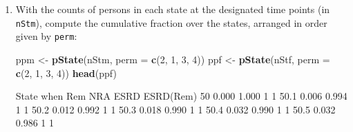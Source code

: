 \documentclass[
]{book}
\newenvironment{Shaded}{\begin{snugshade}}{\end{snugshade}}
\newcommand{\AttributeTok}[1]{\textcolor[rgb]{0.13,0.29,0.53}{#1}}
\newcommand{\DecValTok}[1]{\textcolor[rgb]{0.00,0.00,0.81}{#1}}
\newcommand{\FunctionTok}[1]{\textcolor[rgb]{0.13,0.29,0.53}{\textbf{#1}}}
\newcommand{\NormalTok}[1]{#1}
\newcommand{\OtherTok}[1]{\textcolor[rgb]{0.56,0.35,0.01}{#1}}
\begin{document}
\begin{enumerate}
\begin{Shaded}
\begin{Highlighting}[]
\NormalTok{      State}
\NormalTok{when   NRA Rem ESRD ESRD(Rem)}
\NormalTok{  50   500   0    0         0}
\NormalTok{  50.1 494   3    3         0}
\NormalTok{  50.2 490   6    4         0}
\NormalTok{  50.3 486   9    5         0}
\NormalTok{  50.4 479  16    5         0}
\NormalTok{  50.5 477  16    7         0}
\NormalTok{  50.6 472  20    8         0}
\NormalTok{  50.7 468  22   10         0}
\NormalTok{  50.8 463  24   13         0}
\NormalTok{  50.9 458  26   16         0}
\NormalTok{  51   456  27   17         0}
\NormalTok{  51.1 453  28   19         0}
\NormalTok{  51.2 443  33   24         0}
\NormalTok{  51.3 439  32   28         1}
\NormalTok{  51.4 432  33   34         1}
\end{Highlighting}
\end{Shaded}

  What is in the object \texttt{nStf}?
\item
  With the counts of persons in each state at the
  designated time points (in \texttt{nStm}), compute the cumulative
  fraction over the states, arranged in order given by \texttt{perm}:

\begin{Shaded}
\begin{Highlighting}[]
\NormalTok{ppm }\OtherTok{\textless{}{-}} \FunctionTok{pState}\NormalTok{(nStm, }\AttributeTok{perm =} \FunctionTok{c}\NormalTok{(}\DecValTok{2}\NormalTok{, }\DecValTok{1}\NormalTok{, }\DecValTok{3}\NormalTok{, }\DecValTok{4}\NormalTok{))}
\NormalTok{ppf }\OtherTok{\textless{}{-}} \FunctionTok{pState}\NormalTok{(nStf, }\AttributeTok{perm =} \FunctionTok{c}\NormalTok{(}\DecValTok{2}\NormalTok{, }\DecValTok{1}\NormalTok{, }\DecValTok{3}\NormalTok{, }\DecValTok{4}\NormalTok{))}
\FunctionTok{head}\NormalTok{(ppf)}
\end{Highlighting}
\end{Shaded}

\begin{Shaded}
\begin{Highlighting}[]
\NormalTok{      State}
\NormalTok{when     Rem   NRA ESRD ESRD(Rem)}
\NormalTok{  50   0.000 1.000    1         1}
\NormalTok{  50.1 0.006 0.994    1         1}
\NormalTok{  50.2 0.012 0.992    1         1}
\NormalTok{  50.3 0.018 0.990    1         1}
\NormalTok{  50.4 0.032 0.990    1         1}
\NormalTok{  50.5 0.032 0.986    1         1}
\end{Highlighting}
\end{Shaded}


\end{enumerate}
\end{document}
